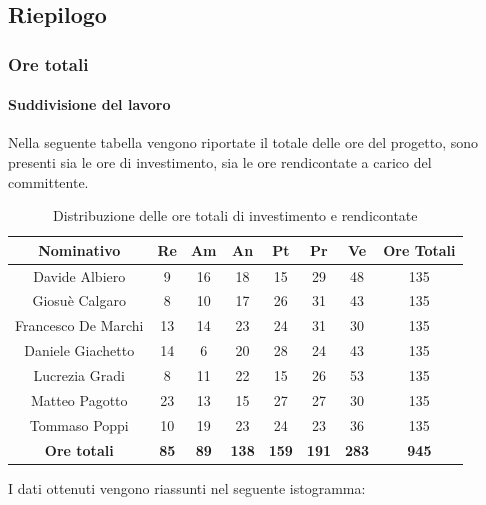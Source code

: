 \subsection{Riepilogo}
\subsubsection{Ore totali}
\paragraph{Suddivisione del lavoro}
Nella seguente tabella vengono riportate il totale delle ore del progetto, sono presenti sia le ore di investimento, sia le ore rendicontate a carico del committente.
\begin{table}[H]
		\begin{center}
			\setlength{\aboverulesep}{0pt}
			\setlength{\belowrulesep}{0pt}
			\setlength{\extrarowheight}{.75ex}
			\begin{tabular}{ c c c c c c c c }
				\rowcolor{AzzurroGruppo!30} 
				\textbf{Nominativo} & \textbf{Re} & \textbf{Am} & \textbf{An} & \textbf{Pt} & \textbf{Pr} & \textbf{Ve} & \textbf{Ore Totali}  \\
				\toprule
				Davide Albiero       & 9 & 16 & 18 & 15 & 29 & 48 & 135 \\
				Giosuè Calgaro      & 8 & 10 & 17 & 26 & 31 & 43 & 135 \\
				Francesco De Marchi & 13 & 14 & 23 & 24 & 31 & 30 & 135\\
				Daniele Giachetto  & 14 & 6 & 20 & 28 & 24 & 43 & 135\\
				Lucrezia Gradi      & 8 & 11 & 22 & 15 & 26 & 53 & 135\\
				Matteo Pagotto      & 23 & 13 & 15 & 27 & 27 & 30 & 135\\
				Tommaso Poppi       & 10 & 19 & 23 & 24 & 23 & 36 & 135\\
				 \textbf{Ore totali} & \textbf{85} & \textbf{89} & \textbf{138} & \textbf{159} & \textbf{191} & \textbf{283} & \textbf{945} \\
				\bottomrule
			\end{tabular}
			\caption{ Distribuzione delle ore totali di investimento e rendicontate}
		\end{center}
	\end{table}
	I dati ottenuti vengono riassunti nel seguente istogramma:
